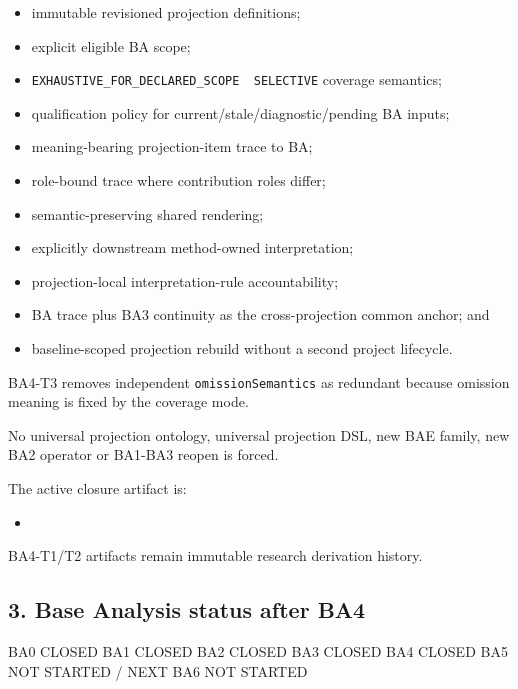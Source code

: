 \documentclass[
  11pt,
  a4paper,
]{article}
\newenvironment{Shaded}{}{}
\newcommand{\NormalTok}[1]{#1}
\providecommand{\tightlist}{%
  \setlength{\itemsep}{0pt}\setlength{\parskip}{0pt}}
\begin{document}
\begin{itemize}
\tightlist
\item
  immutable revisioned projection definitions;
\item
  explicit eligible BA scope;
\item
  \texttt{EXHAUSTIVE\_FOR\_DECLARED\_SCOPE\ \textbar{}\ SELECTIVE}
  coverage semantics;
\item
  qualification policy for current/stale/diagnostic/pending BA inputs;
\item
  meaning-bearing projection-item trace to BA;
\item
  role-bound trace where contribution roles differ;
\item
  semantic-preserving shared rendering;
\item
  explicitly downstream method-owned interpretation;
\item
  projection-local interpretation-rule accountability;
\item
  BA trace plus BA3 continuity as the cross-projection common anchor;
  and
\item
  baseline-scoped projection rebuild without a second project lifecycle.
\end{itemize}

BA4-T3 removes independent \texttt{omissionSemantics} as redundant
because omission meaning is fixed by the coverage mode.

No universal projection ontology, universal projection DSL, new BAE
family, new BA2 operator or BA1-BA3 reopen is forced.

The active closure artifact is:

\begin{itemize}
\tightlist
\item
\end{itemize}

BA4-T1/T2 artifacts remain immutable research derivation history.

\subsection{3. Base Analysis status after
BA4}\label{base-analysis-status-after-ba4}

\begin{Shaded}
\begin{Highlighting}[]
\NormalTok{BA0   CLOSED}
\NormalTok{BA1   CLOSED}
\NormalTok{BA2   CLOSED}
\NormalTok{BA3   CLOSED}
\NormalTok{BA4   CLOSED}
\NormalTok{BA5   NOT STARTED / NEXT}
\NormalTok{BA6   NOT STARTED}
\end{Highlighting}
\end{Shaded}
\end{document}
